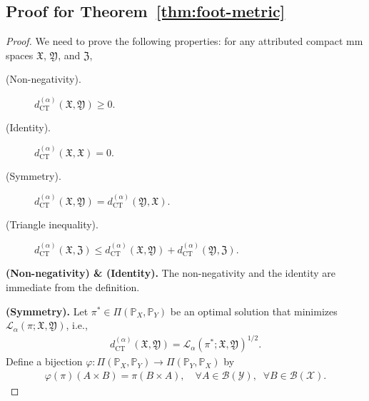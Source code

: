 \documentclass{article}
\theoremstyle{plain}
\theoremstyle{definition}
\theoremstyle{remark}
\begin{document}
\subsection{Proof for Theorem~\ref{thm:foot-metric}}\label{pf:thm:foot-metric}
\begin{proof}
	We need to prove the following properties: for any attributed compact mm spaces $\mathfrak{X}$, $\mathfrak{Y}$, and $\mathfrak{Z}$,
	\begin{description}
		\item[(Non-negativity).] $d_{\mathrm{CT}}^{(\alpha)}(\mathfrak{X},\mathfrak{Y}) \geq 0$.
		\item[(Identity).] $d_{\mathrm{CT}}^{(\alpha)}(\mathfrak{X},\mathfrak{X}) = 0$.
		\item[(Symmetry).] $d_{\mathrm{CT}}^{(\alpha)}(\mathfrak{X},\mathfrak{Y}) = d_{\mathrm{CT}}^{(\alpha)}(\mathfrak{Y},\mathfrak{X})$.
		\item[(Triangle inequality).] $d_{\mathrm{CT}}^{(\alpha)}(\mathfrak{X},\mathfrak{Z}) \leq d_{\mathrm{CT}}^{(\alpha)}(\mathfrak{X},\mathfrak{Y}) + d_{\mathrm{CT}}^{(\alpha)}(\mathfrak{Y},\mathfrak{Z})$.
	\end{description}
	\textbf{(Non-negativity) \& (Identity).} The non-negativity and the identity are immediate from the definition.
	
	\textbf{(Symmetry).} Let $\pi^* \in \Pi(\mathbb{P}_X,\mathbb{P}_Y)$ be an optimal solution that minimizes $\mathcal{L}_{\alpha}(\pi; \mathfrak{X},\mathfrak{Y})$, i.e.,
	\begin{align*}
		d_{\mathrm{CT}}^{(\alpha)}(\mathfrak{X},\mathfrak{Y}) = \mathcal{L}_{\alpha}(\pi^*; \mathfrak{X},\mathfrak{Y})^{1/2} .
	\end{align*}
	Define a bijection $\varphi : \Pi(\mathbb{P}_X,\mathbb{P}_Y) \to \Pi(\mathbb{P}_Y,\mathbb{P}_X)$ by
	\begin{align*}
		\varphi(\pi)(A \times B) = \pi(B \times A) , \quad \forall A \in \mathcal{B}(\mathcal{Y}), \;\; \forall B \in \mathcal{B}(\mathcal{X}).
	\end{align*}
	

\end{proof}
\end{document}
